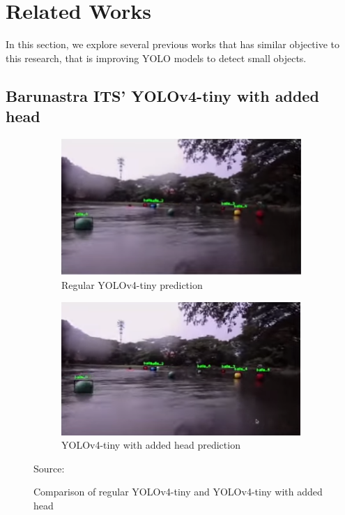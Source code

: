 \section{Related Works}
\label{section:relatedwork}
In this section, we explore several previous works that has similar objective to this research, that is improving YOLO models to detect small objects.

  \subsection{Barunastra ITS' YOLOv4-tiny with added head}%

  \begin{figure}[p]
    \hfill%
    \begin{subfigure}[c][][c]{.45\textwidth}
        \includegraphics[width=1\linewidth]{figures/yolov4barun-regular.png}
        \caption{Regular YOLOv4-tiny prediction}
        \label{fig:barun-yolov4}
    \end{subfigure}\hfill  
    \begin{subfigure}[c][][c]{.45\textwidth}
        \includegraphics[width=1\linewidth]{figures/yolov4barun-addhead.png}
        \caption{YOLOv4-tiny with added head prediction}
        \label{fig:barun-yolov4-3l}
    \end{subfigure}\hfill%
    \caption*{Source: \textcite{barunastra}}
    \vspace{-1ex}
    \caption{Comparison of regular YOLOv4-tiny and YOLOv4-tiny with added head}
    \label{fig:barun}
  \end{figure}

